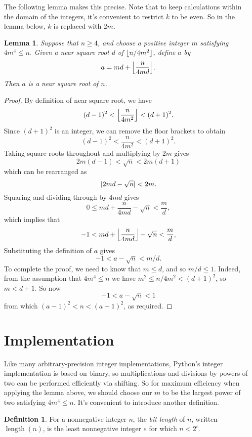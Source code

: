 \documentclass[a4paper]{article}
\DeclarePairedDelimiter\floor{\lfloor}{\rfloor}
\DeclarePairedDelimiter\abs{\lvert}{\rvert}
\DeclareMathOperator{\length}{length}
\theoremstyle{plain}
\newtheorem{lemma}{Lemma}
\theoremstyle{definition}
\newtheorem{definition}{Definition}
\begin{document}
The following lemma makes this precise. Note that to keep calculations within
the domain of the integers, it's convenient to restrict $k$ to be even. So in
the lemma below, $k$ is replaced with $2m$.

\begin{lemma}
  Suppose that $n \ge 4$, and choose a positive integer $m$
  satisfying $4m^4 \le n$. Given a near square root $d$ of $\floor{n / 4m^2}$,
  define $a$ by
  $$ a = md + \floor*{\frac{n}{4md}}. $$
  Then $a$
  is a near square root of $n$.
\end{lemma}

\begin{proof}
  By definition of near square root, we have
  $$ (d - 1)^2 < \floor*{\frac{n}{4m^2}} < (d + 1)^2.$$
  Since $(d + 1)^2$ is an integer, we can remove the floor brackets to obtain
  $$ (d - 1)^2 < \frac{n}{4m^2} < (d + 1)^2.$$
  Taking square roots throughout and multiplying by $2m$ gives
  $$ 2m(d - 1) < \sqrt n < 2m(d + 1)$$
  which can be rearranged as
  $$ \abs{2md - \sqrt n} < 2m. $$
  Squaring and dividing through by $4md$ gives
  $$ 0 \le md + \frac{n}{4md} - \sqrt n < \frac md,$$
  which implies that
  $$ -1 < md + \floor*{\frac{n}{4md}} - \sqrt n < \frac{m}{d},$$
  Substituting the definition of $a$ gives
  $$ -1 < a - \sqrt n < m / d.$$
  To complete the proof, we need to know that $m \le d$, and so $m / d \le 1$.
  Indeed, from the assumption that $4m^4 \le n$ we have $m^2 \le n / 4m^2 < (d
  + 1)^2$, so $m < d + 1$. So now
  $$ -1 < a - \sqrt n < 1 $$
  from which $(a - 1)^2 < n < (a + 1)^2$, as required.
\end{proof}

\section{Implementation}

Like many arbitrary-precision integer implementations, Python's integer
implementation is based on binary, so multiplications and divisions by powers
of two can be performed efficiently via shifting. So for maximum efficiency when
applying the lemma above, we should choose our $m$ to be the largest power of
two satisfying $4m^4 \le n$. It's convenient to introduce another definition.

\begin{definition}
  For a nonnegative integer $n$, the \emph{bit length} of $n$, written
  $\length(n)$, is the least nonnegative integer $e$ for which $n < 2^e$.
\end{definition}
\end{document}
